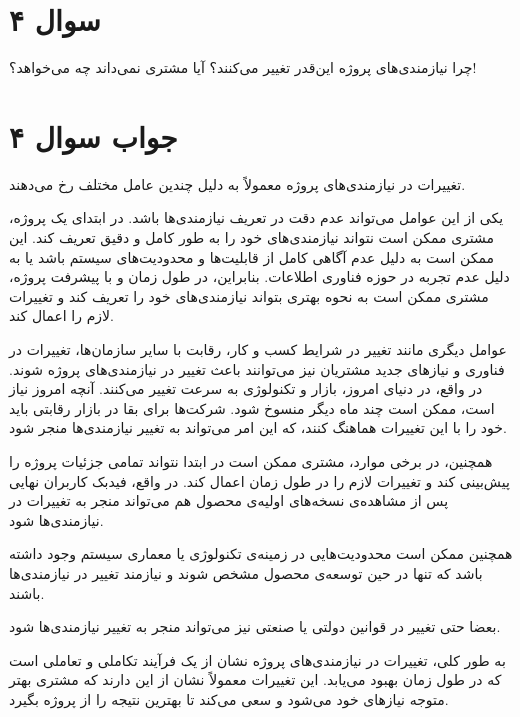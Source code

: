\section*{سوال ۴}

چرا نیازمندی‌های پروژه این‌قدر تغییر می‌کنند؟ آیا مشتری نمی‌داند چه می‌خواهد؟!

\section*{جواب سوال ۴}

تغییرات در نیازمندی‌های پروژه معمولاً به دلیل چندین عامل مختلف رخ می‌دهند.


یکی از این عوامل می‌تواند عدم دقت در تعریف نیازمندی‌ها باشد. در ابتدای یک پروژه، مشتری ممکن است نتواند نیازمندی‌های خود را به طور کامل و دقیق تعریف کند. این ممکن است به دلیل عدم آگاهی کامل از قابلیت‌ها و محدودیت‌های سیستم باشد یا به دلیل عدم تجربه در حوزه فناوری اطلاعات. بنابراین، در طول زمان و با پیشرفت پروژه، مشتری ممکن است به نحوه بهتری بتواند نیازمندی‌های خود را تعریف کند و تغییرات لازم را اعمال کند.


عوامل دیگری مانند تغییر در شرایط کسب و کار، رقابت با سایر سازمان‌ها، تغییرات در فناوری و نیازهای جدید مشتریان نیز می‌توانند باعث تغییر در نیازمندی‌های پروژه شوند. در واقع، در دنیای امروز، بازار و تکنولوژی به سرعت تغییر می‌کنند. آنچه امروز نیاز است، ممکن است چند ماه دیگر منسوخ شود. شرکت‌ها برای بقا در بازار رقابتی باید خود را با این تغییرات هماهنگ کنند، که این امر می‌تواند به تغییر نیازمندی‌ها منجر شود.


همچنین، در برخی موارد، مشتری ممکن است در ابتدا نتواند تمامی جزئیات پروژه را پیش‌بینی کند و تغییرات لازم را در طول زمان اعمال کند. در واقع، فیدبک کاربران نهایی پس از مشاهده‌ی نسخه‌های اولیه‌ی محصول هم می‌تواند منجر به تغییرات در نیازمندی‌ها شود.


همچنین ممکن است محدودیت‌هایی در زمینه‌ی تکنولوژی یا معماری سیستم وجود داشته باشد که تنها در حین توسعه‌ی محصول مشخص شوند و نیازمند تغییر در نیازمندی‌ها باشند.


بعضا حتی تغییر در قوانین دولتی یا صنعتی نیز می‌تواند منجر به تغییر نیازمندی‌ها شود.


به طور کلی، تغییرات در نیازمندی‌های پروژه نشان از یک فرآیند تکاملی و تعاملی است که در طول زمان بهبود می‌یابد. این تغییرات معمولاً نشان از این دارند که مشتری بهتر متوجه نیازهای خود می‌شود و سعی می‌کند تا بهترین نتیجه را از پروژه بگیرد.